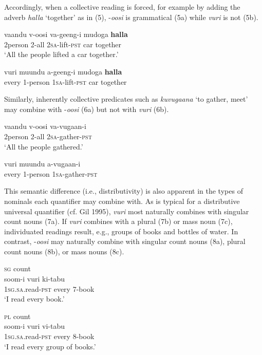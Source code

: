 \documentclass[output=paper]{langsci/langscibook}
\begin{document}
Accordingly, when a collective reading is forced, for example by adding the adverb \textit{halla} ‘together’ as in (5), -\textit{oosi} is grammatical (5a) while \textit{vuri} is not (5b).    

\ea 
\gll vaandu    v-oosi  va-geeng-i    mudoga  \textbf{halla}\\
     2person  2-all  2\textsc{sa}{}-lift-\textsc{pst}  car    together\\
\glt ‘All the people lifted a car together.’
\z

\ea
\gll *vuri  muundu  a-geeng-i  mudoga  \textbf{halla}\\
     every  1-person  1\textsc{sa}{}-lift-\textsc{pst}  car    together\\
\z

Similarly, inherently collective predicates such as \textit{kuvugaana} ‘to gather, meet’ may combine with -\textit{oosi} (6a) but not with \textit{vuri} (6b).

\ea
\gll vaandu  v-oosi    va-vugaan-i\\
     2person  2-all    2\textsc{sa}{}-gather-\textsc{pst}  \\
\glt ‘All the people gathered.’
\z

\ea
\gll *vuri  muundu  a-vugaan-i  \\
     every  1-person  1\textsc{sa}{}-gather-\textsc{pst}  \\
\z

  This semantic difference (i.e., distributivity) is also apparent in the types of nominals each quantifier may combine with. As is typical for a distributive universal quantifier (cf. Gil 1995), \textit{vuri} most naturally combines with singular count nouns (7a). If \textit{vuri} combines with a plural (7b) or mass noun (7c), individuated readings result, e.g., groups of books and bottles of water. In contrast, -\textit{oosi} may naturally combine with singular count nouns (8a), plural count nouns (8b), or mass nouns (8c).

\ea
\textsc{sg} count\\
\gll soom-i      vuri    ki-tabu    \\
     1\textsc{sg.sa}.read-\textsc{pst}  every    7-book  \\
\glt ‘I read every book.’
\z

\ea
\textsc{pl} count\\
\gll soom-i      vuri    vi-tabu    \\
     1\textsc{sg.sa}.read-\textsc{pst}  every    8-book\\
\glt ‘I read every group of books.’
\z
\end{document}
